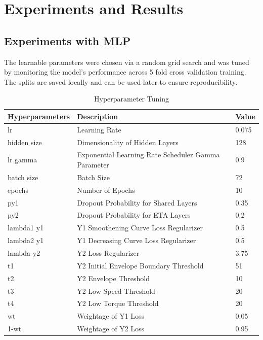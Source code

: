 \documentclass{report} %
\begin{document}
\newpage 
\newpage 

\chapter{Experiments and Results}

\section{Experiments with \ac{MLP}}\label{sec:Experiments with MLP}

The learnable parameters were chosen via a random grid search  and was tuned by monitoring the model's performance across 5 fold cross validation training.\\
The splits are saved locally and can be used later to ensure reproducibility.

\begin{table}[H]
    \centering
    \begin{tabularx}{1\linewidth}{|X|X|X|}
    \hline {\bf Hyperparameters} & {\bf Description} & {\bf Value}\\
    \hline 
    lr & Learning Rate & 0.075 \\
    hidden size & Dimensionality of Hidden Layers& 128 \\
    lr gamma & Exponential Learning Rate Scheduler Gamma Parameter & 0.9 \\
    batch size & Batch Size & 72 \\
    epochs & Number of Epochs & 10 \\
    py1 & Dropout Probability for Shared Layers & 0.35 \\
    py2 & Dropout Probability for ETA Layers & 0.2 \\
    lambda1 y1 & Y1 Smoothening Curve Loss Regularizer & 0.5 \\
    lambda2 y1 & Y1 Decreasing Curve Loss Regularizer & 0.5 \\
    lambda y2 & Y2 Loss Regularizer & 3.75 \\
    t1 & Y2 Initial Envelope Boundary Threshold & 51 \\
    t2 & Y2 Envelope Threshold & 10 \\
    t3 & Y2 Low Speed Threshold & 20 \\
    t4 & Y2 Low Torque Threshold & 20 \\
    wt & Weightage of Y1 Loss & 0.05 \\
    1-wt & Weightage of Y2 Loss & 0.95 \\
    \hline
    \end{tabularx}
    \caption{Hyperparameter Tuning}
    \label{tab:Hyperparameter Tunings}
\end{table}
\end{document}
